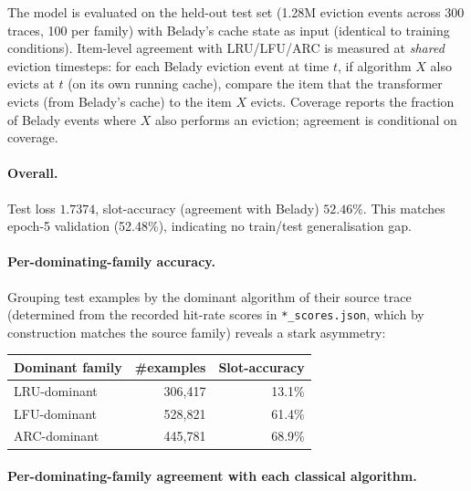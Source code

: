 \documentclass{article}
\begin{document}
The model is evaluated on the held-out test set (1.28M eviction events
across 300 traces, 100 per family) with Belady's cache state as input
(identical to training conditions). Item-level agreement with LRU/LFU/ARC is
measured at \emph{shared} eviction timesteps: for each Belady eviction event
at time $t$, if algorithm $X$ also evicts at $t$ (on its own running cache),
compare the item that the transformer evicts (from Belady's cache) to the
item $X$ evicts. Coverage reports the fraction of Belady events where $X$
also performs an eviction; agreement is conditional on coverage.

\paragraph{Overall.} Test loss $1.7374$, slot-accuracy (agreement with
Belady) $52.46\%$. This matches epoch-5 validation (52.48\%), indicating no
train/test generalisation gap.

\paragraph{Per-dominating-family accuracy.} Grouping test examples by the
dominant algorithm of their source trace (determined from the recorded
hit-rate scores in \texttt{*\_scores.json}, which by construction matches
the source family) reveals a stark asymmetry:

\begin{center}
\begin{tabular}{lrr}
\toprule
Dominant family & \#examples & Slot-accuracy \\
\midrule
LRU-dominant & 306,417 & 13.1\% \\
LFU-dominant & 528,821 & 61.4\% \\
ARC-dominant & 445,781 & 68.9\% \\
\bottomrule
\end{tabular}
\end{center}

\paragraph{Per-dominating-family agreement with each classical algorithm.}
\end{document}
